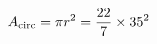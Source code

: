 \documentclass[preview]{standalone}
\begin{document}
\begin{align*}
\special{dvisvgm:raw <g id='unique000'>}A_{\text{circ}} = \pi r^2= \frac{22}{7} \times 35^2\special{dvisvgm:raw </g>}
\end{align*}
\end{document}
